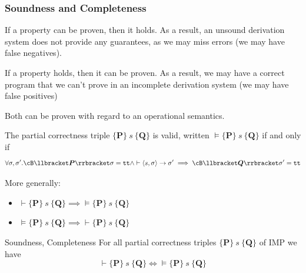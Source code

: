 \subsubsection{Soundness and Completeness}
\inlinedefinition[Soundness] If a property can be proven, then it holds.
As a result, an unsound derivation system does not provide any guarantees, as we may miss errors (we may have false negatives).

\inlinedefinition[Completeness] If a property holds, then it can be proven.
As a result, we may have a correct program that we can't prove in an incomplete derivation system (we may have false positives)

Both can be proven with regard to an operational semantics.

\inlineexample The partial correctness triple $\{ \bm{P} \} \ s \ \{ \bm{Q} \}$ is valid, written $\models \{ \bm{P} \} \ s \ \{ \bm{Q} \}$ if and only if
\[
    \forall \sigma, \sigma'. \cB \llbracket \bm{P} \rrbracket \sigma = \texttt{tt} \land \vdash \langle s, \sigma \rangle \rightarrow \sigma'
    \implies \cB \llbracket \bm{Q} \rrbracket \sigma' = \texttt{tt}
\]

More generally:
\begin{itemize}
    \item {} $\vdash \{ \bm{P} \} \ s \ \{ \bm{Q} \} \implies \models \{ \bm{P} \} \ s \ \{ \bm{Q} \}$
    \item {} $\models \{ \bm{P} \} \ s \ \{ \bm{Q} \} \implies \vdash \{ \bm{P} \} \ s \ \{ \bm{Q} \}$
\end{itemize}

\begin{theorem}[]{Soundness, Completeness}
    For all partial correctness triples $\{ \bm{P} \} \ s \ \{ \bm{Q} \}$ of IMP we have
    \[
        \vdash \{ \bm{P} \} \ s \ \{ \bm{Q} \} \Leftrightarrow \models \{ \bm{P} \} \ s \ \{ \bm{Q} \}
    \]
\end{theorem}
